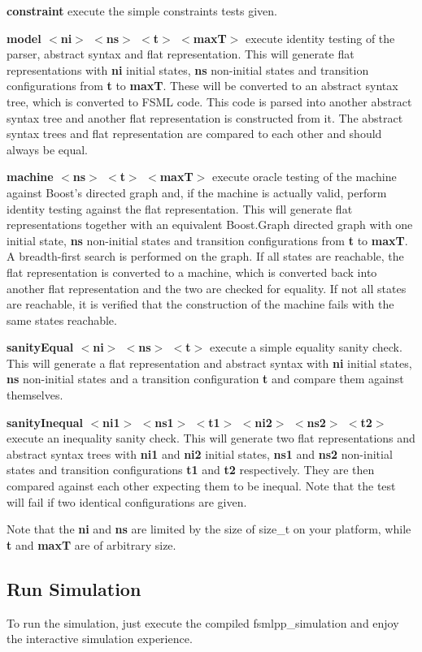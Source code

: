 \begin{DoxyItemize}
\item {\bfseries constraint} execute the simple constraints tests given.
\item {\bfseries model $<$ni$>$ $<$ns$>$ $<$t$>$ $<$max\-T$>$} execute identity testing of the parser, abstract syntax and flat representation. This will generate flat representations with {\bfseries ni} initial states, {\bfseries ns} non-\/initial states and transition configurations from {\bfseries t} to {\bfseries max\-T}. These will be converted to an abstract syntax tree, which is converted to F\-S\-M\-L code. This code is parsed into another abstract syntax tree and another flat representation is constructed from it. The abstract syntax trees and flat representation are compared to each other and should always be equal.
\item {\bfseries machine $<$ns$>$ $<$t$>$ $<$max\-T$>$} execute oracle testing of the machine against Boost's directed graph and, if the machine is actually valid, perform identity testing against the flat representation. This will generate flat representations together with an equivalent Boost.\-Graph directed graph with one initial state, {\bfseries ns} non-\/initial states and transition configurations from {\bfseries t} to {\bfseries max\-T}. A breadth-\/first search is performed on the graph. If all states are reachable, the flat representation is converted to a machine, which is converted back into another flat representation and the two are checked for equality. If not all states are reachable, it is verified that the construction of the machine fails with the same states reachable.
\item {\bfseries sanity\-Equal $<$ni$>$ $<$ns$>$ $<$t$>$} execute a simple equality sanity check. This will generate a flat representation and abstract syntax with {\bfseries ni} initial states, {\bfseries ns} non-\/initial states and a transition configuration {\bfseries t} and compare them against themselves.
\item {\bfseries sanity\-Inequal $<$ni1$>$ $<$ns1$>$ $<$t1$>$ $<$ni2$>$ $<$ns2$>$ $<$t2$>$} execute an inequality sanity check. This will generate two flat representations and abstract syntax trees with {\bfseries ni1} and {\bfseries ni2} initial states, {\bfseries ns1} and {\bfseries ns2} non-\/initial states and transition configurations {\bfseries t1} and {\bfseries t2} respectively. They are then compared against each other expecting them to be inequal. Note that the test will fail if two identical configurations are given.
\end{DoxyItemize}

Note that the {\bfseries ni} and {\bfseries ns} are limited by the size of {\ttfamily size\-\_\-t} on your platform, while {\bfseries t} and {\bfseries max\-T} are of arbitrary size.

\subsection*{Run Simulation}

To run the simulation, just execute the compiled {\ttfamily fsmlpp\-\_\-simulation} and enjoy the interactive simulation experience. 